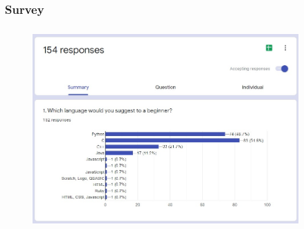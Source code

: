 \documentclass[14pt]{beamer}
\begin{document}
\begin{frame}
     \frametitle{Survey}
     \begin{figure}[htbp]
         \centerline{\includegraphics[width=4in, height=3in]{./Codiac/logos/form.jpeg}}
         \begin{spacing}{0.25}
         \end{spacing}
     \end{figure}
 \end{frame}
\end{document}
